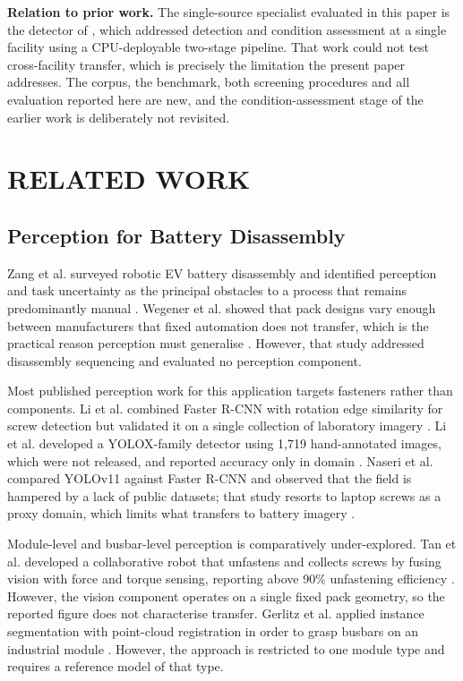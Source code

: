 \noindent\textbf{Relation to prior work.} The single-source specialist evaluated in this paper is the detector of \cite{katiyar2026mvml}, which addressed detection and condition assessment at a single facility using a CPU-deployable two-stage pipeline. That work could not test cross-facility transfer, which is precisely the limitation the present paper addresses. The corpus, the benchmark, both screening procedures and all evaluation reported here are new, and the condition-assessment stage of the earlier work is deliberately not revisited.

\section{\uppercase{Related Work}}
\label{sec:related}

\subsection{Perception for Battery Disassembly}

\noindent Zang et al. surveyed robotic EV battery disassembly and identified
perception and task uncertainty as the principal obstacles to a process that remains
predominantly manual \cite{zang2024robotic}. Wegener et al. showed that pack designs vary enough
between manufacturers that fixed automation does not transfer, which is the practical
reason perception must generalise \cite{wegener2015}. However, that study addressed disassembly
sequencing and evaluated no perception component.

Most published perception work for this application targets fasteners rather than
components. Li et al. combined Faster R-CNN with rotation edge similarity for screw detection but
validated it on a single collection of laboratory imagery \cite{screwrcnn2021}. Li et al. developed
a YOLOX-family detector using 1,719 hand-annotated images, which were not released, and
reported accuracy only in domain \cite{screwbatt2023}. Naseri et al. compared YOLOv11 against Faster
R-CNN and observed that the field is hampered by a lack of public datasets; that study
resorts to laptop screws as a proxy domain, which limits what transfers to battery
imagery \cite{screwcompare2026}.

Module-level and busbar-level perception is comparatively under-explored. Tan et al. developed a collaborative robot that unfastens and
collects screws by fusing vision with force and torque sensing, reporting above
90\% unfastening efficiency \cite{tan2025screws}. However, the vision component operates on a single
fixed pack geometry, so the reported figure does not characterise transfer.
Gerlitz et al. applied instance segmentation with point-cloud
registration in order to grasp busbars on an industrial module \cite{cvmodule2023}. However, the
approach is restricted to one module type and requires a reference model of that
type.

